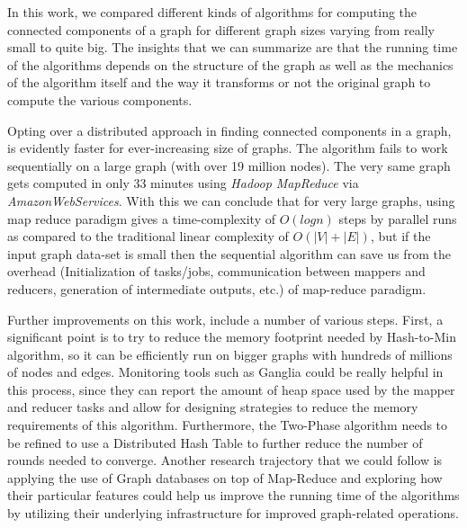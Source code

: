 In this work, we compared different kinds of algorithms for computing the connected components of a graph for different graph sizes varying from really small to quite big. The insights that we can summarize are that the running time of the algorithms depends on the structure of the graph as well as the mechanics of the algorithm itself and the way it transforms or not the original graph to compute the various components.

Opting over a distributed approach in finding connected components in a graph, is evidently faster for ever-increasing size of graphs. The algorithm fails to work sequentially on a large graph (with over 19 million nodes). The very same graph gets computed in only 33 minutes using \textit{Hadoop MapReduce} via \textit{AmazonWebServices}. With this we can conclude that for very large graphs, using map reduce paradigm gives a time-complexity of \textit{$O(logn)$} steps by parallel runs as compared to the traditional linear complexity of \textit{$O(|V| + |E|)$}, but if the input graph data-set is small then the sequential algorithm can save us from the overhead  (\eg Initialization of tasks/jobs, communication between mappers and reducers, generation of intermediate outputs, etc.) of map-reduce paradigm.

Further improvements on this work, include a number of various steps. First, a significant point is to try to reduce the memory footprint needed by Hash-to-Min algorithm, so it can be efficiently run on bigger graphs with hundreds of millions of nodes and edges. Monitoring tools such as Ganglia could be really helpful in this process, since they can report the amount of heap space used by the mapper and reducer tasks and allow for designing strategies to reduce the memory requirements of this algorithm. Furthermore, the Two-Phase algorithm needs to be refined to use a Distributed Hash Table to further reduce the number of rounds needed to converge. Another research trajectory that we could follow is applying the use of Graph databases on top of Map-Reduce and exploring how their particular features could help us improve the running time of the algorithms by utilizing their underlying infrastructure for improved graph-related operations.
